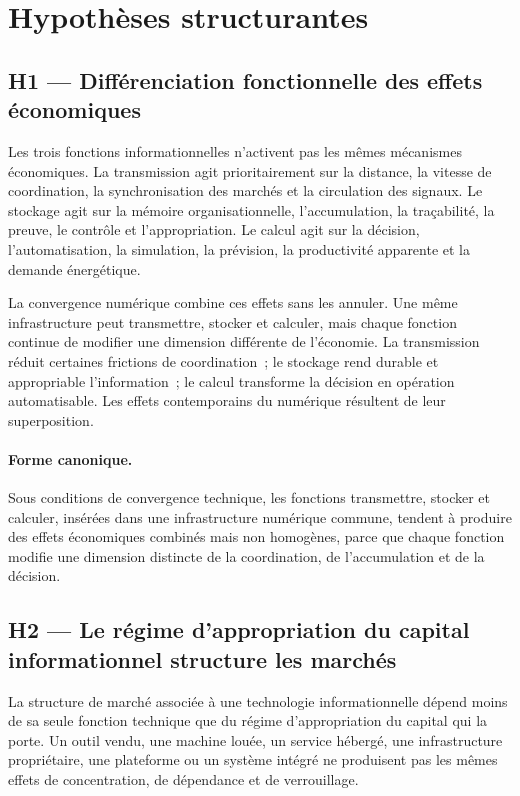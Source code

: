 \section{Hypothèses structurantes}

\subsection{H1 --- Différenciation fonctionnelle des effets économiques}

Les trois fonctions informationnelles n'activent pas les mêmes mécanismes économiques. La transmission agit prioritairement sur la distance, la vitesse de coordination, la synchronisation des marchés et la circulation des signaux. Le stockage agit sur la mémoire organisationnelle, l'accumulation, la traçabilité, la preuve, le contrôle et l'appropriation. Le calcul agit sur la décision, l'automatisation, la simulation, la prévision, la productivité apparente et la demande énergétique.

La convergence numérique combine ces effets sans les annuler. Une même infrastructure peut transmettre, stocker et calculer, mais chaque fonction continue de modifier une dimension différente de l'économie. La transmission réduit certaines frictions de coordination~; le stockage rend durable et appropriable l'information~; le calcul transforme la décision en opération automatisable. Les effets contemporains du numérique résultent de leur superposition.

\paragraph{Forme canonique.}
Sous conditions de convergence technique, les fonctions transmettre, stocker et calculer, insérées dans une infrastructure numérique commune, tendent à produire des effets économiques combinés mais non homogènes, parce que chaque fonction modifie une dimension distincte de la coordination, de l'accumulation et de la décision.

\subsection{H2 --- Le régime d'appropriation du capital informationnel structure les marchés}

La structure de marché associée à une technologie informationnelle dépend moins de sa seule fonction technique que du régime d'appropriation du capital qui la porte. Un outil vendu, une machine louée, un service hébergé, une infrastructure propriétaire, une plateforme ou un système intégré ne produisent pas les mêmes effets de concentration, de dépendance et de verrouillage.

